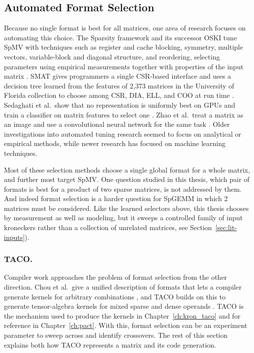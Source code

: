 \subsection{Automated Format Selection}
Because no single format is best for all matrices, one area of research focuses on automating this choice. The Sparsity framework and its successor
OSKI tune SpMV with techniques such as register and cache blocking, symmetry, multiple vectors, variable-block and diagonal structure,
and reordering, selecting parameters using empirical measurements together with properties of the input matrix \cite{vuduc2003thesis,vuduc2005oski}.
SMAT gives programmers a single CSR-based interface and uses a decision tree learned from the features of 2,373 matrices in the University of Florida
collection to choose among CSR, DIA, ELL, and COO at run time \cite{li2013smat}. Sedaghati et al.\ show that no representation is uniformly best
on GPUs and train a classifier on matrix features to select one \cite{sedaghati2015automatic}.
Zhao et al.\ treat a matrix as an image and use a convolutional neural network for the same task \cite{zhao2018bridging}. Older investigations into automated
tuning research seemed to focus on analytical or empirical methods, while newer research has focused on machine learning techniques.

Most of these selection methods choose a single global format for a whole matrix, and further most target SpMV. One question studied in this thesis,
which pair of formats is best for a product of two sparse matrices, is not addressed by them. And indeed format selection
is a harder question for SpGEMM in which 2 matrices must be considered. Like the learned selectors above, this thesis chooses by measurement as well
as modeling, but it sweeps a controlled family of input kroneckers rather than a collection of unrelated matrices, see Section~\ref{sec:lit-inputs}).

\newcommand{\tarr}[4]{%
  \node[tname] at ({#1-0.1},{#2}) {#3};
  \foreach \v [count=\i from 0] in {#4} {%
    \node[tcell] at ({#1+\i*0.46+0.23},{#2}) {\v};}}

\subsubsection{TACO.}
Compiler work approaches the problem of format selection from the other direction. Chou et al.\ give a unified description of formats
that lets a compiler generate kernels for arbitrary combinations \cite{taco_formats}, and TACO builds on this to generate tensor-algebra kernels
for mixed sparse and dense operands \cite{taco}. TACO is the mechanism used to produce the kernels in Chapter~\ref{ch:kron_taco}
and for reference in Chapter~\ref{ch:pact}. With this, format selection can be an experiment parameter to sweep across and identify crossovers.
The rest of this section explains both how TACO represents a matrix and its code generation.

